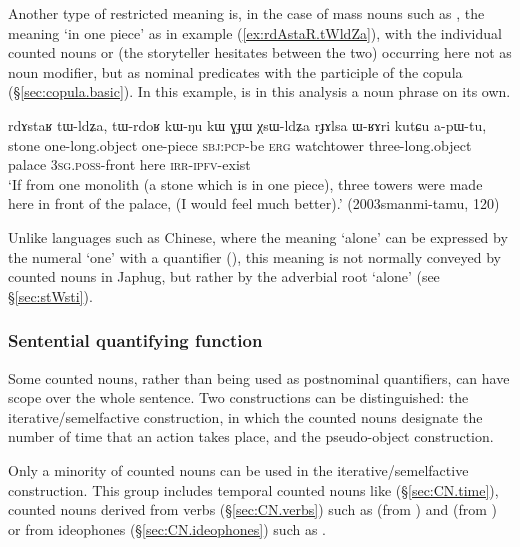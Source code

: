 Another type of restricted meaning is, in the case of mass nouns such as , the meaning `in one piece' as in example (\ref{ex:rdAstaR.tWldZa}), with the individual counted nouns  or  (the storyteller hesitates between the two) occurring here not as noun modifier, but as nominal predicates with the participle of the copula  (§\ref{sec:copula.basic}). In this example,  is in this analysis a noun phrase on its own.

\begin{exe}
	\ex \label{ex:rdAstaR.tWldZa}
	\gll rdɤstaʁ tɯ-ldʑa, tɯ-rdoʁ kɯ-ŋu kɯ ɣɟɯ χsɯ-ldʑa rɟɤlsa ɯ-ʁɤri kutɕu a-pɯ-tu, \\
	stone one-long.object one-piece \textsc{sbj}:\textsc{pcp}-be \textsc{erg} watchtower three-long.object palace \textsc{3sg}.\textsc{poss}-front here \textsc{irr}-\textsc{ipfv}-exist \\
	\glt `If from one monolith (a stone which is in one piece), three  towers were made here in front of the palace, (I would feel much better).'  (2003smanmi-tamu, 120)
\end{exe} 

Unlike languages such as Chinese, where the meaning  `alone' can be expressed by the numeral `one' with a quantifier (), this meaning is not normally conveyed by counted nouns in Japhug, but rather by the adverbial root  `alone' (see §\ref{sec:stWsti}).

\subsubsection{Sentential quantifying function } \label{sec:CN.iterative}
Some counted nouns, rather than being used as postnominal quantifiers, can have scope over the whole sentence. Two constructions can be distinguished: the iterative/semelfactive construction, in which the counted nouns designate the number of time that an action takes place, and the pseudo-object construction.

Only a minority of counted nouns can be used in the iterative/semelfactive construction. This group includes temporal counted nouns like  (§\ref{sec:CN.time}),  counted nouns derived from verbs (§\ref{sec:CN.verbs})  such as  (from ) and  (from ) or from ideophones  (§\ref{sec:CN.ideophones}) such as .

